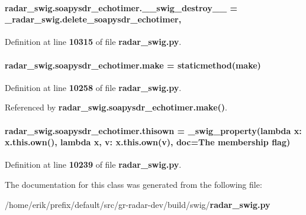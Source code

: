 \paragraph[{\+\_\+\+\_\+swig\+\_\+destroy\+\_\+\+\_\+}]{\setlength{\rightskip}{0pt plus 5cm}radar\+\_\+swig.\+soapysdr\+\_\+echotimer.\+\_\+\+\_\+swig\+\_\+destroy\+\_\+\+\_\+ = \+\_\+radar\+\_\+swig.\+delete\+\_\+soapysdr\+\_\+echotimer\hspace{0.3cm}{\ttfamily [static]}, {\ttfamily [private]}}\label{classradar__swig_1_1soapysdr__echotimer_adc186f087b1ce42d43c7d98fe41eda2a}


Definition at line {\bf 10315} of file {\bf radar\+\_\+swig.\+py}.

\paragraph[{make}]{\setlength{\rightskip}{0pt plus 5cm}radar\+\_\+swig.\+soapysdr\+\_\+echotimer.\+make = staticmethod(make)\hspace{0.3cm}{\ttfamily [static]}}\label{classradar__swig_1_1soapysdr__echotimer_a771ed033ea063298e0b745c6db69797b}


Definition at line {\bf 10258} of file {\bf radar\+\_\+swig.\+py}.



Referenced by {\bf radar\+\_\+swig.\+soapysdr\+\_\+echotimer.\+make()}.

\paragraph[{thisown}]{\setlength{\rightskip}{0pt plus 5cm}radar\+\_\+swig.\+soapysdr\+\_\+echotimer.\+thisown = {\bf \+\_\+swig\+\_\+property}(lambda x\+: x.\+this.\+own(), lambda {\bf x}, v\+: x.\+this.\+own(v), doc=\textquotesingle{}The membership flag\textquotesingle{})\hspace{0.3cm}{\ttfamily [static]}}\label{classradar__swig_1_1soapysdr__echotimer_a95e42db99d76d4c66bc2886f23514756}


Definition at line {\bf 10239} of file {\bf radar\+\_\+swig.\+py}.



The documentation for this class was generated from the following file\+:\begin{DoxyCompactItemize}
\item 
/home/erik/prefix/default/src/gr-\/radar-\/dev/build/swig/{\bf radar\+\_\+swig.\+py}\end{DoxyCompactItemize}
